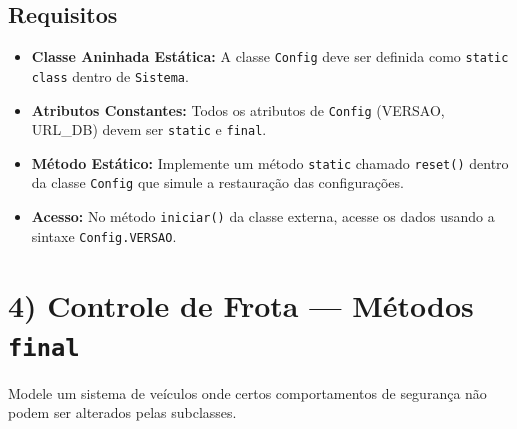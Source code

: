 \documentclass[12pt]{article}
\begin{document}
\subsection*{Requisitos}
\begin{itemize}
    \item \textbf{Classe Aninhada Estática:} A classe \texttt{Config} deve ser definida como \texttt{static class} dentro de \texttt{Sistema}.
    \item \textbf{Atributos Constantes:} Todos os atributos de \texttt{Config} (VERSAO, URL\_DB) devem ser \texttt{static} e \texttt{final}.
    \item \textbf{Método Estático:} Implemente um método \texttt{static} chamado \texttt{reset()} dentro da classe \texttt{Config} que simule a restauração das configurações.
    \item \textbf{Acesso:} No método \texttt{iniciar()} da classe externa, acesse os dados usando a sintaxe \texttt{Config.VERSAO}.
\end{itemize}

\section*{4) Controle de Frota — Métodos \texttt{final}}
Modele um sistema de veículos onde certos comportamentos de segurança não podem ser alterados pelas subclasses.

\begin{center}
\end{center}
\end{document}
